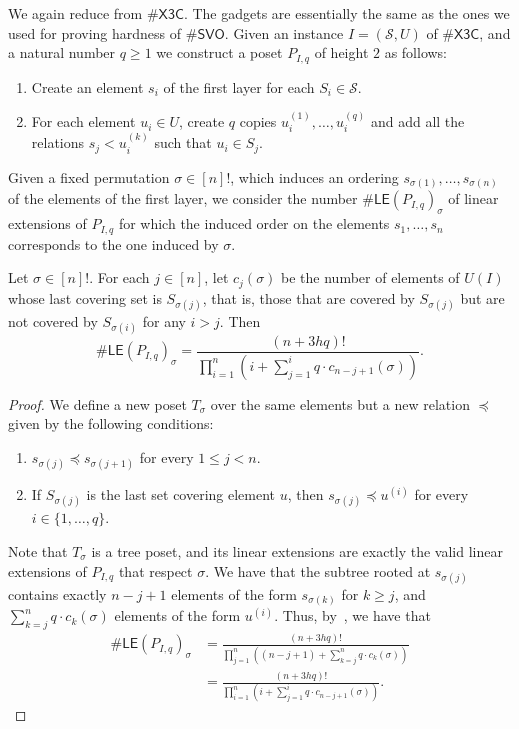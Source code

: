 \documentclass[11pt]{amsart}
\newcommand{\ns}{s}
\begin{document}
We again reduce from $\#\mathsf{X3C}$. The gadgets are essentially the same as the ones we used for proving hardness of $\#\mathsf{SVO}$. Given an instance $I = (\mathcal{S}, U)$ of $\#\mathsf{X3C}$, and a natural number $q \geq 1$ we construct a poset $P_{I, q}$ of height $2$ as follows:
\begin{enumerate}
    \item Create an element $\ns_i$ of the first layer for each $S_i \in \mathcal{S}$.
    \item For each element $u_i \in U$, create $q$ copies $u_i^{(1)}, \dots, u_i^{(q)}$ and add all the relations $\ns_j < u_i^{(k)}$ such that $u_i \in S_j$.
\end{enumerate} 

Given a fixed permutation $\sigma \in [n]!$, which induces an ordering $\ns_{\sigma(1)}, \ldots, \ns_{\sigma(n)}$ of the elements of the first layer, we consider the number $\#\mathsf{LE}(P_{I, q})_{\sigma}$ of linear extensions of $P_{I, q}$ for which the induced order on the elements $\ns_1, \dots, \ns_n$ corresponds to the one induced by $\sigma$.

\begin{lemma}\label{lemma:le-formula}
Let $\sigma \in [n]!$. For each $j \in [n]$, let $c_j(\sigma)$ be the number of elements of $U(I)$ whose last covering set is $S_{\sigma(j)}$, that is, those that are covered by $S_{\sigma(j)}$ but are not covered by $S_{\sigma(i)}$ for any $i>j$. Then 
\[
    \#\mathsf{LE}(P_{I, q})_{\sigma} =  \frac{(n+3hq)!}{\prod_{i=1}^n \left(i + \sum_{j=1}^{i} q\cdot c_{n-j+1}(\sigma)\right)}.
    \]
\end{lemma}

\begin{proof}
 We define a new poset $T_{\sigma}$ over the same elements but a new relation $\preceq$ given by the following conditions:
\begin{enumerate}
    \item $\ns_{\sigma(j)} \preceq \ns_{\sigma(j+1)}$ for every $1 \leq j < n$.
    \item If $S_{\sigma(j)}$ is the last set covering element $u$, then $\ns_{\sigma(j)} \preceq u^{(i)}$ for every $i \in \{1, \ldots, q\}$.
\end{enumerate}
Note that $T_{\sigma}$ is a tree poset, and its linear extensions are exactly the valid linear extensions of $P_{I, q}$ that respect $\sigma$. We have that the subtree rooted at $\ns_{\sigma(j)}$ contains exactly $n-j+1$ elements of the form $\ns_{\sigma(k)}$ for $k \geq j$, and $\sum_{k=j}^n q \cdot c_{k}(\sigma)$ elements of the form $u^{(i)}$.
Thus, by~, we have that
\begin{align*}
    \#\mathsf{LE}(P_{I, q})_{\sigma} &= \frac{(n+3hq)!}{\prod_{j=1}^n \left((n-j+1) + \sum_{k=j}^n q \cdot c_{k}(\sigma)\right)}\\
    &=  \frac{(n+3hq)!}{\prod_{i=1}^n \left(i + \sum_{j=1}^{i} q\cdot c_{n-j+1}(\sigma)\right)} \tag{change variables}.
\end{align*}
\end{proof}
\end{document}
